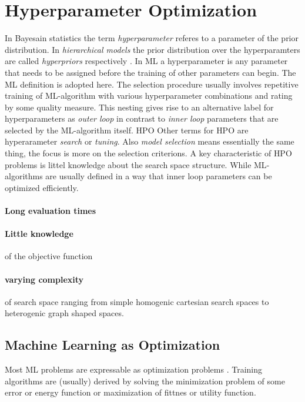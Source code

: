 \documentclass[english]{article}
\begin{document}
\section{Hyperparameter Optimization}
In Bayesain statistics the term \textit{hyperparameter} referes to a parameter of the prior distribution. In \textit{hierarchical models} the prior distribution over the hyperparamters are called \textit{hyperpriors} respectively \cite[p.408]{bishop_neural_1995}. In \acf{ML} a hyperparameter is any parameter that needs to be assigned before the training of other parameters can begin. The \ac{ML} definition is adopted here. The selection procedure usually involves repetitive training of \ac{ML}-algorithm with various hyperparameter combinations and rating by some quality measure. This nesting gives rise to an alternative label for hyperparameters as \textit{outer loop} in contrast to \textit{inner loop} parameters that are selected by the \ac{ML}-algorithm itself. \acf{HPO} Other terms for \ac{HPO} are hyperarameter \textit{search} or \textit{tuning}.
Also \textit{model selection} means essentially the same thing, the focus is more on the selection criterions.
A key characteristic of \ac{HPO} problems is littel knowledge about the search space structure.  While \ac{ML}-algorithms are usually defined in a way that inner loop parameters can be optimized efficiently.
\paragraph{Long evaluation times}
\paragraph{Little knowledge} of the objective function
\paragraph{varying complexity} of search space ranging from simple homogenic cartesian search spaces to heterogenic graph shaped spaces.

\subsection{Machine Learning as Optimization}
Most \acf{ML} problems are expressable as optimization problems \cite{bennett_interplay_2006}. Training algorithms are (usually) derived by solving the minimization problem of some error or energy function or maximization of fittnes or utility function.
\end{document}
